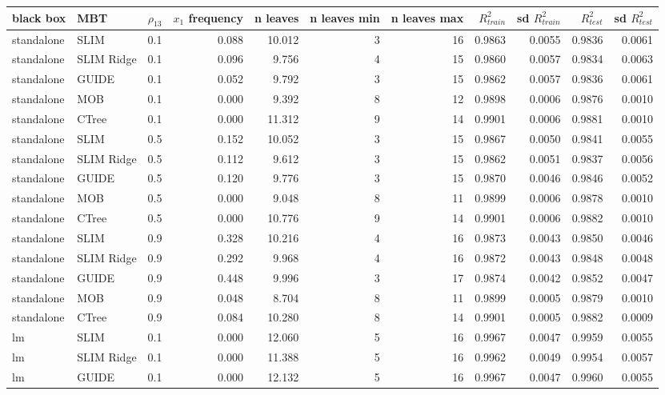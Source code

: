\begin{table}[!htb]
\centering \tiny
\begin{tabular}[t]{l|l|r|r|r|r|r|r|r|r|r}
\hline
black box & MBT & $\rho_{13}$ & $x_1$ frequency & n leaves & n leaves min & n leaves max & $R^2_{train}$  & sd $R^2_{train}$ & $R^2_{test}$ & sd $R^2_{test}$ \\
\hline
standalone & SLIM & 0.1 & 0.088 & 10.012 & 3 & 16 & 0.9863 & 0.0055 & 0.9836 & 0.0061\\
standalone & SLIM Ridge & 0.1 & 0.096 & 9.756 & 4 & 15 & 0.9860 & 0.0057 & 0.9834 & 0.0063\\
standalone & GUIDE & 0.1 & 0.052 & 9.792 & 3 & 15 & 0.9862 & 0.0057 & 0.9836 & 0.0061\\
standalone & MOB & 0.1 & 0.000 & 9.392 & 8 & 12 & 0.9898 & 0.0006 & 0.9876 & 0.0010\\
standalone & CTree & 0.1 & 0.000 & 11.312 & 9 & 14 & 0.9901 & 0.0006 & 0.9881 & 0.0010\\
\hline
standalone & SLIM & 0.5 & 0.152 & 10.052 & 3 & 15 & 0.9867 & 0.0050 & 0.9841 & 0.0055\\
standalone & SLIM Ridge & 0.5 & 0.112 & 9.612 & 3 & 15 & 0.9862 & 0.0051 & 0.9837 & 0.0056\\
standalone & GUIDE & 0.5 & 0.120 & 9.776 & 3 & 15 & 0.9870 & 0.0046 & 0.9846 & 0.0052\\
standalone & MOB & 0.5 & 0.000 & 9.048 & 8 & 11 & 0.9899 & 0.0006 & 0.9878 & 0.0010\\
standalone & CTree & 0.5 & 0.000 & 10.776 & 9 & 14 & 0.9901 & 0.0006 & 0.9882 & 0.0010\\
\hline
standalone & SLIM & 0.9 & 0.328 & 10.216 & 4 & 16 & 0.9873 & 0.0043 & 0.9850 & 0.0046\\
standalone & SLIM Ridge & 0.9 & 0.292 & 9.968 & 4 & 16 & 0.9872 & 0.0043 & 0.9848 & 0.0048\\
standalone & GUIDE & 0.9 & 0.448 & 9.996 & 3 & 17 & 0.9874 & 0.0042 & 0.9852 & 0.0047\\
standalone & MOB & 0.9 & 0.048 & 8.704 & 8 & 11 & 0.9899 & 0.0005 & 0.9879 & 0.0010\\
standalone & CTree & 0.9 & 0.084 & 10.280 & 8 & 14 & 0.9901 & 0.0005 & 0.9882 & 0.0009\\
\hline
lm & SLIM & 0.1 & 0.000 & 12.060 & 5 & 16 & 0.9967 & 0.0047 & 0.9959 & 0.0055\\
lm & SLIM Ridge & 0.1 & 0.000 & 11.388 & 5 & 16 & 0.9962 & 0.0049 & 0.9954 & 0.0057\\
lm & GUIDE & 0.1 & 0.000 & 12.132 & 5 & 16 & 0.9967 & 0.0047 & 0.9960 & 0.0055\\

\end{tabular}
\end{table}
